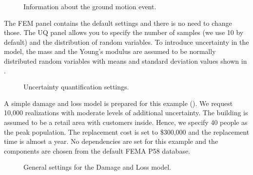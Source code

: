 \begin{figure}[!htbp]
  \caption{Information about the ground motion event.}
  \label{fig:ex_1_EVT}
\end{figure}

The FEM panel contains the default settings and there is no need to change those. The UQ panel allows you to specify the number of samples (we use 10 by default) and the distribution of random variables. To introduce uncertainty in the model, the mass and the Young’s modulus are assumed to be normally distributed random variables with means and standard deviation values shown in .\\

\begin{figure}[!htbp]
  \caption{Uncertainty quantification settings.}
  \label{fig:ex_1_UQ}
\end{figure}

A simple damage and loss model is prepared for this example (). We request 10,000 realizations with moderate levels of additional uncertainty. The building is assumed to be a retail area with customers inside. Hence, we specify 40 people as the peak population. The replacement cost is set to \$300,000 and the replacement time is almost a year. No dependencies are set for this example and the components are chosen from the default FEMA P58 database.\\

\begin{figure}[!htbp]
  \caption{General settings for the Damage and Loss model.}
  \label{fig:ex_1_DL_1}
\end{figure}

